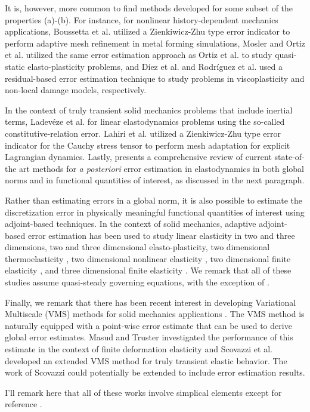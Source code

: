 \documentclass{article}
\begin{document}
It is, however, more common to find methods developed for some subset of
the properties (a)-(b). For instance, for nonlinear history-dependent
mechanics applications,  Boussetta et al. \cite{boussetta2006adaptive}
utilized a Zienkiwicz-Zhu type error indicator to perform adaptive mesh
refinement in metal forming simulations, Mosler and Ortiz et al. utilized the
same error estimation approach as Ortiz et al. \cite{radovitzky1999error,
mosler2007variational} to study quasi-static elasto-plasticity problems,
and D{\'i}ez et al. \cite{diez2000adaptivity} and Rodr{\'i}guez et al.
\cite{rodríguez2000error} used a residual-based error estimation technique
to study problems in viscoplasticity and non-local damage models,
respectively.

In the context of truly transient solid mechanics problems that include
inertial terms, Ladev{\'e}ze et al. \cite{ladeveze2003estimation,
combe2002discretization} for linear elastodynamics problems using the
so-called constitutive-relation error. Lahiri et al. utilized a
Zienkiwicz-Zhu type error indicator for the Cauchy stress tensor to perform
mesh adaptation for explicit Lagrangian dynamics. Lastly,
\cite{verdugo2014error} presents a comprehensive review of current
state-of-the art methods for \emph{a posteriori} error estimation in
elastodynamics in both global norms and in functional quantities of interest,
as discussed in the next paragraph.

Rather than estimating errors in a global norm, it is also possible to
estimate the discretization error in physically meaningful functional
quantities of interest using adjoint-based techniques. 
In the context of solid mechanics, adaptive adjoint-based error estimation
has been used to study linear elasticity in two
\cite{rannacher1997feed, stein2007error, gonzalez2014mesh} and three
\cite{ghorashi2014goal} dimensions, two
\cite{rannacher1998posteriori, rannacher1999posteriori} and three
\cite{ghorashi2017goal} dimensional elasto-plasticity, two dimensional
thermoelasticity \cite{rabizadeh2015adaptive}, two dimensional
nonlinear elasticity \cite{larsson2002strategies}, two dimensional
finite elasticity \cite{whiteley2014error}, and three dimensional
finite elasticity \cite{granzow2018adjoint}. We remark that all of these
studies assume quasi-steady governing equations, with the exception
of \cite{verdugo2014error}.

Finally, we remark that there has been recent interest in developing
Variational Multiscale (VMS) methods for solid mechanics applications
\cite{masud2013framework, masud2013framework, scovazzi2016simple}.
The VMS method is naturally equipped with a point-wise error estimate
that can be used to derive global error estimates.  Masud and Truster
investigated the performance of this estimate in the context of
finite deformation elasticity and Scovazzi et al. developed an extended
VMS method for truly transient elastic behavior. The work of Scovazzi
could potentially be extended to include error estimation results.

I'll remark here that all of these works involve simplical elements
except for reference \cite{biotteau2012three}.



\end{document}

